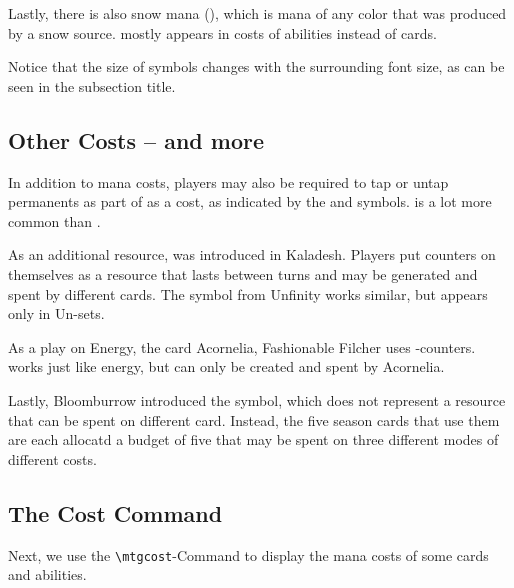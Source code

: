 \documentclass[a4paper]{scrartcl}
\begin{document}
	Lastly, there is also snow mana (\mtgS), which is mana of any color that was produced by a snow source.
	\mtgSnow{} mostly appears in costs of abilities instead of cards.

	Notice that the size of symbols changes with the surrounding font size, as can be seen in the subsection title.

	\subsection*{Other Costs -- \mtgP{} and more}

	In addition to mana costs, players may also be required to tap or untap permanents as part of as a cost, as indicated by the \mtgTap{} and \mtgUntap{} symbols.
	\mtgT{} is a lot more common than \mtgQ.

	As an additional resource, \mtgEnergy{} was introduced in Kaladesh.
	Players put \mtgE{} counters on themselves as a resource that lasts between turns and may be generated and spent by different cards.
	The \mtgTicket{} symbol from Unfinity works similar, but appears only in Un-sets.

	As a play on Energy, the card Acornelia, Fashionable Filcher uses \mtgA-counters.
	\mtgAcorn works just like energy, but can only be created and spent by Acornelia.

	Lastly, Bloomburrow introduced the \mtgP{} symbol, which does not represent a resource that can be spent on different card.
	Instead, the five season cards that use them are each allocatd a budget of five \mtgPawprint{} that may be spent on three different modes of different costs.

	\subsection*{The Cost Command}

	Next, we use the \texttt{\textbackslash mtgcost}-Command to display the mana costs of some cards and abilities.
\end{document}
